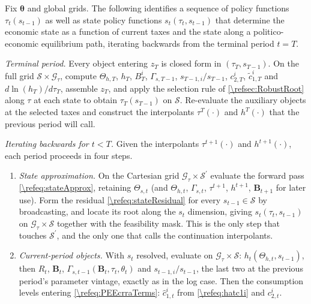 \begin{alg}
\label{\refalg:CRRA:grid}
Fix $\bm{\theta}$ and global grids. The following identifies a sequence of policy functions $\tau_t(s_{t-1})$ as well as state policy functions $s_t(\tau_t, s_{t-1})$ that determine the economic state as a function of current taxes and the state along a politico-economic equilibrium path, iterating backwards from the terminal period $t=T$.

\smallskip\noindent\emph{Terminal period.}
Every object entering $z_T$ is closed form in $(\tau_T, s_{T-1})$. On the full grid $\mathcal{S}\times\mathcal{G}_{\tau}$, compute $\Theta_{h,T}$, $h_T$, $B_T^i$, $\Gamma_{s,T-1}$, $s_{T-1,i}/s_{T-1}$, $c_{2,T}^i$, $\tilde{c}_{1,T}^i$ and $d\ln(h_T)/d\tau_T$, assemble $z_T$, and apply the selection rule of \cref{\refsec:RobustRoot} along $\tau$ at each state to obtain $\tau_T(s_{T-1})$ on $\mathcal{S}$. Re-evaluate the auxiliary objects at the selected taxes and construct the interpolants $\tau^T(\cdot)$ and $h^T(\cdot)$ that the previous period will call.

\smallskip\noindent\emph{Iterating backwards for $t<T$.} Given the interpolants $\tau^{t+1}(\cdot)$ and $h^{t+1}(\cdot)$, each period proceeds in four steps.

\begin{enumerate}
    \item \emph{State approximation.} On the Cartesian grid $\mathcal{G}_{\tau}\times\mathcal{S}^{\prime}$ evaluate the forward pass \eqref{\refeq:stateApprox}, retaining $\Theta_{s,t}$ (and $\Theta_{h,t}$, $\Gamma_{s,t}$, $\tau^{t+1}$, $h^{t+1}$, $\bm{B}_{t+1}$ for later use). Form the residual \eqref{\refeq:stateResidual} for every $s_{t-1}\in\mathcal{S}$ by broadcasting, and locate its root along the $s_t$ dimension, giving $s_t(\tau_t, s_{t-1})$ on $\mathcal{G}_{\tau}\times\mathcal{S}$ together with the feasibility mask. This is the only step that touches $\mathcal{S}^{\prime}$, and the only one that calls the continuation interpolants.

    \item \emph{Current-period objects.} With $s_t$ resolved, evaluate on $\mathcal{G}_{\tau}\times\mathcal{S}$: $h_t\left(\Theta_{h,t}, s_{t-1}\right)$, then $R_t$, $\bm{B}_t$, $\Gamma_{s,t-1}\left(\bm{B}_t, \tau_t, \theta_t\right)$ and $s_{t-1,i}/s_{t-1}$, the last two at the previous period's parameter vintage, exactly as in the log case. Then the consumption levels entering \eqref{\refeq:PEEcrraTerms}: $\hat{c}_{1,t}^i$ from \eqref{\refeq:hatc1i} and $c_{2,t}^i$.


\end{enumerate}
\end{alg}
